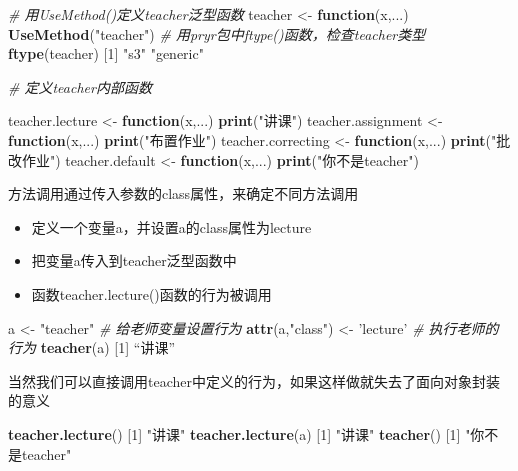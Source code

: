 \documentclass[]{book}
\newenvironment{Shaded}{\begin{snugshade}}{\end{snugshade}}
\newcommand{\KeywordTok}[1]{\textcolor[rgb]{0.13,0.29,0.53}{\textbf{#1}}}
\newcommand{\DecValTok}[1]{\textcolor[rgb]{0.00,0.00,0.81}{#1}}
\newcommand{\StringTok}[1]{\textcolor[rgb]{0.31,0.60,0.02}{#1}}
\newcommand{\CommentTok}[1]{\textcolor[rgb]{0.56,0.35,0.01}{\textit{#1}}}
\newcommand{\ControlFlowTok}[1]{\textcolor[rgb]{0.13,0.29,0.53}{\textbf{#1}}}
\newcommand{\NormalTok}[1]{#1}
\begin{document}
\begin{Shaded}
\begin{Highlighting}[]
\CommentTok{# 用UseMethod()定义teacher泛型函数}
\NormalTok{teacher <-}\StringTok{ }\ControlFlowTok{function}\NormalTok{(x,...) }\KeywordTok{UseMethod}\NormalTok{(}\StringTok{"teacher"}\NormalTok{)}
\CommentTok{# 用pryr包中ftype()函数，检查teacher类型}
\KeywordTok{ftype}\NormalTok{(teacher)}
\NormalTok{[}\DecValTok{1}\NormalTok{] }\StringTok{"s3"} \StringTok{"generic"}

\CommentTok{# 定义teacher内部函数}

\NormalTok{teacher.lecture <-}\StringTok{ }\ControlFlowTok{function}\NormalTok{(x,...) }\KeywordTok{print}\NormalTok{(}\StringTok{"讲课"}\NormalTok{)}
\NormalTok{teacher.assignment <-}\StringTok{ }\ControlFlowTok{function}\NormalTok{(x,...) }\KeywordTok{print}\NormalTok{(}\StringTok{"布置作业"}\NormalTok{)}
\NormalTok{teacher.correcting <-}\StringTok{ }\ControlFlowTok{function}\NormalTok{(x,...) }\KeywordTok{print}\NormalTok{(}\StringTok{"批改作业"}\NormalTok{)}
\NormalTok{teacher.default <-}\StringTok{ }\ControlFlowTok{function}\NormalTok{(x,...) }\KeywordTok{print}\NormalTok{(}\StringTok{"你不是teacher"}\NormalTok{)}
\end{Highlighting}
\end{Shaded}

方法调用通过传入参数的class属性，来确定不同方法调用

\begin{itemize}
\item
  定义一个变量a，并设置a的class属性为lecture
\item
  把变量a传入到teacher泛型函数中
\item
  函数teacher.lecture()函数的行为被调用
\end{itemize}

\begin{Shaded}
\begin{Highlighting}[]
\NormalTok{a <-}\StringTok{ "teacher"}
\CommentTok{# 给老师变量设置行为}
\KeywordTok{attr}\NormalTok{(a,}\StringTok{"class"}\NormalTok{) <-}\StringTok{ 'lecture'}
\CommentTok{# 执行老师的行为}
\KeywordTok{teacher}\NormalTok{(a)}
\NormalTok{[}\DecValTok{1}\NormalTok{] “讲课”}
\end{Highlighting}
\end{Shaded}

当然我们可以直接调用teacher中定义的行为，如果这样做就失去了面向对象封装的意义

\begin{Shaded}
\begin{Highlighting}[]
\KeywordTok{teacher.lecture}\NormalTok{()}
\NormalTok{[}\DecValTok{1}\NormalTok{] }\StringTok{"讲课"}
\KeywordTok{teacher.lecture}\NormalTok{(a)}
\NormalTok{[}\DecValTok{1}\NormalTok{] }\StringTok{"讲课"}
\KeywordTok{teacher}\NormalTok{()}
\NormalTok{[}\DecValTok{1}\NormalTok{] }\StringTok{"你不是teacher"}
\end{Highlighting}
\end{Shaded}
\end{document}

